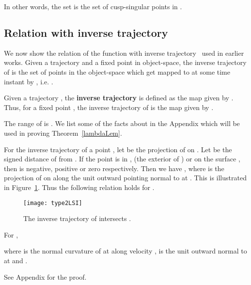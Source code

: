 \documentclass{elsart5p}
\newcommand{\eat}[1]{}
\begin{document}
In other words, the set  is the set of cusp-singular points in .

\subsection{Relation with inverse trajectory}  \label{inverseTrajSec}

We now show the relation of the function  with inverse 
trajectory~\cite{trimming, classifyPoints} used in earlier works.
Given a trajectory  and a fixed point  in object-space, 
the inverse trajectory of  is
the set of points in the object-space which get mapped to  at some time instant by , i.e. 
.  

\begin{defn} \label{invTrajDef}
Given a trajectory , the {\bf inverse trajectory}  is defined as the map  given by .  
Thus, for a fixed point , the inverse trajectory of  is the map  
given by . 
\end{defn}
The range of  is .  We list some of the facts about 
 in the Appendix  which will be used in proving Theorem~\ref{lambdaLem}.

For the inverse trajectory  of a point , let  be 
the projection of  on .  Let  be the signed distance 
of  from . If the point  is in ,  
(the exterior of ) or on the surface , then  is negative, positive 
or zero respectively.  Then we have , where  is the 
projection of  on  along the unit outward pointing normal 
 to  at .  This is illustrated in Figure~\ref{type2LSIFig}.
Thus the following relation holds for .


\begin{figure}
 \centering
 \texttt{[image: type2LSI]}
 \caption{The inverse trajectory of  intersects .}
 \label{type2LSIFig}
\end{figure}

\begin{thm} \label{lambdaLem}
For , 

 where  is the normal curvature of  at  
along velocity ,  is the unit outward normal to  at  and 
.
\end{thm}
See Appendix for the proof.
\eat{
\noindent {\em Proof.}
 Differentiating Eq.~\ref{lambdaEq} with respect to time and denoting derivative w.r.t.  by , we get

At , .  Since , it follows from Eq.~B.5 that .  It is easy to verify that .  Hence, 

From Eq.~\ref{ddotLambdaEq} and Eq.~B.7 it follows that

Since   for all  in some neighbourhood  of , we have that .  
Hence .  
Hence  = .  
Here  is the differential of the Gauss map, i.e. the curvature tensor of 
 at point .  Using this in Eq.~\ref{ddotLambdaTNotEq} and the fact that  ,  we get

Recalling definition of  from Eq.~\ref{thetaEq}

Here  and  
where  is the shape operator (differential of the Gauss map) of  at .  
Also,  and .  Assume without loss of generality that  
and , hence ,  and . Using Eq.~B.3 and the fact that   we get

From Eqs.~\ref{lsi2Eq} and~\ref{lsiRelationEq} and the fact that  we get 
.
\hfill 
}
\end{document}
